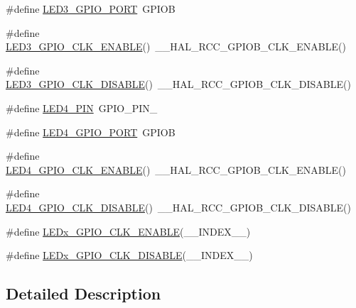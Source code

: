 \begin{DoxyCompactItemize}
\item 
\#define \hyperlink{group__B-L072Z-LRWAN1__LOW__LEVEL__LED_ga050f4b3a1f402476f9541dfe975d2143}{L\+E\+D3\+\_\+\+G\+P\+I\+O\+\_\+\+P\+O\+RT}~G\+P\+I\+OB
\item 
\#define \hyperlink{group__B-L072Z-LRWAN1__LOW__LEVEL__LED_gaac6c1162fc6bf1b60265e6fb7622e306}{L\+E\+D3\+\_\+\+G\+P\+I\+O\+\_\+\+C\+L\+K\+\_\+\+E\+N\+A\+B\+LE}()~\+\_\+\+\_\+\+H\+A\+L\+\_\+\+R\+C\+C\+\_\+\+G\+P\+I\+O\+B\+\_\+\+C\+L\+K\+\_\+\+E\+N\+A\+B\+LE()
\item 
\#define \hyperlink{group__B-L072Z-LRWAN1__LOW__LEVEL__LED_ga705278d726c1340f18576ca2d74f6e81}{L\+E\+D3\+\_\+\+G\+P\+I\+O\+\_\+\+C\+L\+K\+\_\+\+D\+I\+S\+A\+B\+LE}()~\+\_\+\+\_\+\+H\+A\+L\+\_\+\+R\+C\+C\+\_\+\+G\+P\+I\+O\+B\+\_\+\+C\+L\+K\+\_\+\+D\+I\+S\+A\+B\+LE()
\item 
\#define \hyperlink{group__B-L072Z-LRWAN1__LOW__LEVEL__LED_gaae684bb3d2f940637ccbc2adeb0e134d}{L\+E\+D4\+\_\+\+P\+IN}~G\+P\+I\+O\+\_\+\+P\+I\+N\+\_
\item 
\#define \hyperlink{group__B-L072Z-LRWAN1__LOW__LEVEL__LED_ga6b6f3eb4d23b770de265803afbc2b61b}{L\+E\+D4\+\_\+\+G\+P\+I\+O\+\_\+\+P\+O\+RT}~G\+P\+I\+OB
\item 
\#define \hyperlink{group__B-L072Z-LRWAN1__LOW__LEVEL__LED_ga301aa5a187b24af8c121a462d2b08deb}{L\+E\+D4\+\_\+\+G\+P\+I\+O\+\_\+\+C\+L\+K\+\_\+\+E\+N\+A\+B\+LE}()~\+\_\+\+\_\+\+H\+A\+L\+\_\+\+R\+C\+C\+\_\+\+G\+P\+I\+O\+B\+\_\+\+C\+L\+K\+\_\+\+E\+N\+A\+B\+LE()
\item 
\#define \hyperlink{group__B-L072Z-LRWAN1__LOW__LEVEL__LED_ga9c737fb47feaa0f730edbe5251750353}{L\+E\+D4\+\_\+\+G\+P\+I\+O\+\_\+\+C\+L\+K\+\_\+\+D\+I\+S\+A\+B\+LE}()~\+\_\+\+\_\+\+H\+A\+L\+\_\+\+R\+C\+C\+\_\+\+G\+P\+I\+O\+B\+\_\+\+C\+L\+K\+\_\+\+D\+I\+S\+A\+B\+LE()
\item 
\#define \hyperlink{group__B-L072Z-LRWAN1__LOW__LEVEL__LED_ga32faaf3f04d44e7eddce1d781587fc57}{L\+E\+Dx\+\_\+\+G\+P\+I\+O\+\_\+\+C\+L\+K\+\_\+\+E\+N\+A\+B\+LE}(\+\_\+\+\_\+\+I\+N\+D\+E\+X\+\_\+\+\_\+)
\item 
\#define \hyperlink{group__B-L072Z-LRWAN1__LOW__LEVEL__LED_gaced1ef8f2a770d8c516ebc499b291df1}{L\+E\+Dx\+\_\+\+G\+P\+I\+O\+\_\+\+C\+L\+K\+\_\+\+D\+I\+S\+A\+B\+LE}(\+\_\+\+\_\+\+I\+N\+D\+E\+X\+\_\+\+\_\+)
\end{DoxyCompactItemize}


\subsection{Detailed Description}



